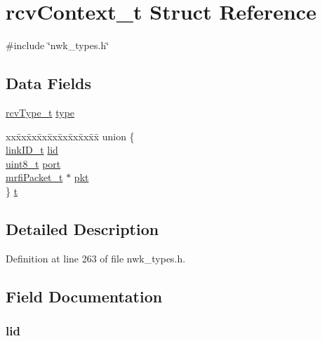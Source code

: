 \hypertarget{structrcvContext__t}{\section{rcv\-Context\-\_\-t \-Struct \-Reference}
\label{structrcvContext__t}
}


{\ttfamily \#include \char`\"{}nwk\-\_\-types.\-h\char`\"{}}

\subsection*{\-Data \-Fields}
\begin{DoxyCompactItemize}
\item 
\hyperlink{nwk__types_8h_aaf936af9ae60f17cd313577c0022b1e0}{rcv\-Type\-\_\-t} \hyperlink{structrcvContext__t_a3db35c24c9a9e3bbc08b807e05ad5c58}{type}
\item 
\begin{tabbing}
xx\=xx\=xx\=xx\=xx\=xx\=xx\=xx\=xx\=\kill
union \{\\
\>\hyperlink{nwk__types_8h_a542d45d12faba7ae8fd0c989ef2c8528}{linkID\_t} \hyperlink{structrcvContext__t_ac37c121af45cbf458e3af68c470b5531}{lid}\\
\>\hyperlink{bsp__msp430__defs_8h_aba7bc1797add20fe3efdf37ced1182c5}{uint8\_t} \hyperlink{structrcvContext__t_a2fa54f9024782843172506fadbee2ac8}{port}\\
\>\hyperlink{structmrfiPacket__t}{mrfiPacket\_t} $\ast$ \hyperlink{structrcvContext__t_ad103301359467b3f838dbf32b25299a8}{pkt}\\
\} \hyperlink{structrcvContext__t_a15f73357939d5a39511cda6e8eb5d198}{t}\\

\end{tabbing}\end{DoxyCompactItemize}


\subsection{\-Detailed \-Description}


\-Definition at line 263 of file nwk\-\_\-types.\-h.



\subsection{\-Field \-Documentation}
\hypertarget{structrcvContext__t_ac37c121af45cbf458e3af68c470b5531}{
\subsubsection[{lid}]{ {\bf lid}}}\label{structrcvContext__t_ac37c121af45cbf458e3af68c470b5531}


